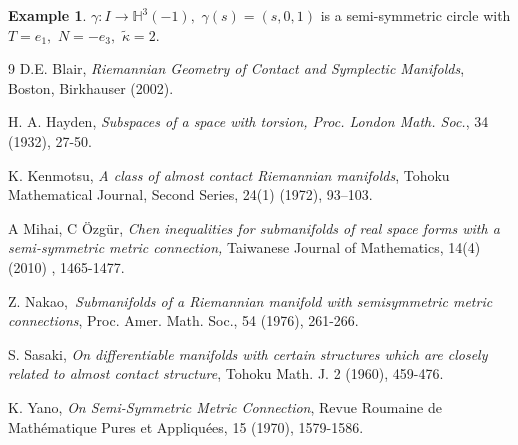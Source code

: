 \documentclass{amsart}
\theoremstyle{plain}
\theoremstyle{definition}
\newtheorem{example}{Example}
\theoremstyle{remark}
\numberwithin{equation}{section}
\begin{document}
\begin{example}
$\gamma :I\rightarrow \mathbb{H}^{3}(-1),$ $\gamma \left( s\right) =\left(
s,0,1\right) $ is a semi-symmetric circle with $T=e_{1},$ $N=-e_{3},$ $%
\widetilde{\kappa }=2.$
\end{example}

\begin{thebibliography}{9}
 D.E. Blair, \textit{Riemannian Geometry of Contact and
Symplectic Manifolds}, Boston, Birkhauser (2002).

 H. A. Hayden, \textit{Subspaces of a space with torsion,
Proc. London Math. Soc.}, 34 (1932), 27-50.

 K. Kenmotsu, \textit{A class of almost contact Riemannian
manifolds}, Tohoku Mathematical Journal, Second Series, 24(1) (1972),
93--103.

 A Mihai, C \"{O}zg\"{u}r, \textit{Chen inequalities
for submanifolds of real space forms with a semi-symmetric metric connection,%
}Taiwanese Journal of Mathematics, 14(4) (2010) , 1465-1477.

 Z. Nakao,\textit{\ Submanifolds of a Riemannian manifold
with semisymmetric metric connections}, Proc. Amer. Math. Soc., 54 (1976),
261-266.

 S. Sasaki, \textit{On differentiable manifolds with certain
structures which are closely related to almost contact structure}, Tohoku
Math. J. 2 (1960), 459-476.

 K. Yano, \textit{On Semi-Symmetric Metric Connection}, Revue
Roumaine de Math\'{e}matique Pures et Appliqu\'{e}es, 15 (1970), 1579-1586.
\end{thebibliography}
\end{document}
